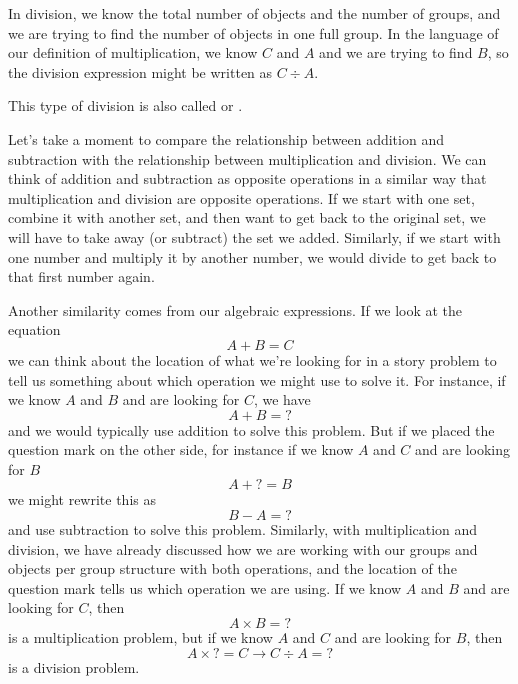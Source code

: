 \documentclass{ximera}
\begin{document}
\begin{definition}
In  division, we know the total number of objects and the number of groups, and we are trying to find the number of objects in one full group. In the language of our definition of multiplication, we know $C$ and $A$ and we are trying to find $B$, so the division expression might be written as $C \div A$.
\begin{image}
\end{image}

This type of division is also called  or .
\end{definition}

Let's take a moment to compare the relationship between addition and subtraction with the relationship between multiplication and division. We can think of addition and subtraction as opposite operations in a similar way that multiplication and division are opposite operations. If we start with one set, combine it with another set, and then want to get back to the original set, we will have to take away (or subtract) the set we added. Similarly, if we start with one number and multiply it by another number, we would divide to get back to that first number again. 

Another similarity comes from our algebraic expressions. If we look at the equation
\[
A + B = C
\]
we can think about the location of what we're looking for in a story problem to tell us something about which operation we might use to solve it. For instance, if we know $A$ and $B$ and are looking for $C$, we have
\[
A + B = ?
\]
and we would typically use addition to solve this problem. But if we placed the question mark on the other side, for instance if we know $A$ and $C$ and are looking for $B$
\[
A + ? = B
\]
we might rewrite this as 
\[
B - A = ?
\]
and use subtraction to solve this problem. Similarly, with multiplication and division, we have already discussed how we are working with our groups and objects per group structure with both operations, and the location of the question mark tells us which operation we are using. If we know $A$ and $B$ and are looking for $C$, then
\[
A \times B = ?
\]
is a multiplication problem, but if we know $A$ and $C$ and are looking for $B$, then
\[
A \times ? = C \rightarrow C \div A = ?
\]
is a division problem.
\end{document}
